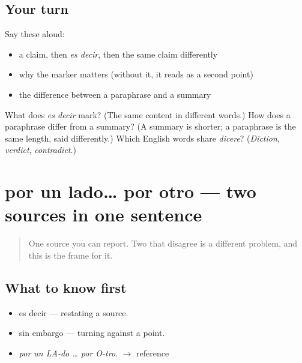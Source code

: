 \subsection*{Your turn}
Say these aloud:

\begin{itemize}
\raggedright
  \item a claim, then \emph{es decir}, then the same claim differently
  \item why the marker matters (without it, it reads as a second point)
  \item the difference between a paraphrase and a summary
\end{itemize}

\begin{tcolorbox}[breakable,colback=teal!4,colframe=teal!35!black,title={Before you move on}]
What does \emph{es decir} mark? (The same content in different words.) How does a paraphrase differ from a summary? (A summary is shorter; a paraphrase is the same length, said differently.) Which English words share \emph{dicere}? (\emph{Diction}, \emph{verdict}, \emph{contradict}.)
\end{tcolorbox}
\section[por un lado… por otro]{por un lado… por otro — two sources in one sentence}

\label{lesson:ES-C277-por-un-lado}



\begin{quote}
One source you can report. Two that disagree is a different problem, and this is the frame for it.
\end{quote}

\subsection*{What to know first}
\begin{itemize}
\raggedright
  \item es decir — restating a source.
  \item sin embargo — turning against a point.
\end{itemize}

\begin{sounds}
\begin{itemize}
\raggedright
  \item \emph{por un LA-do … por O-tro}. $\to$ reference
\end{itemize}
\end{sounds}

